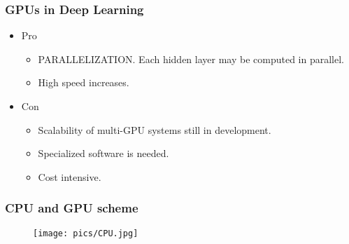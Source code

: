 \documentclass[9pt]{beamer}
\begin{document}
\begin{frame}
\frametitle{GPUs in Deep Learning}
\begin{itemize}
\item Pro 
\begin{itemize}
\item PARALLELIZATION. Each hidden layer may be computed in parallel. 
\item High speed increases.
\end{itemize}
\item Con
\begin{itemize}
\item Scalability of multi-GPU systems still in development.
\item Specialized software is needed.
\item Cost intensive.
\end{itemize}
\end{itemize}
\end{frame}

\begin{frame}
\frametitle{CPU and GPU scheme}
\begin{figure}
\centering
\texttt{[image: pics/CPU.jpg]}
\end{figure}
\end{frame}
\end{document}
